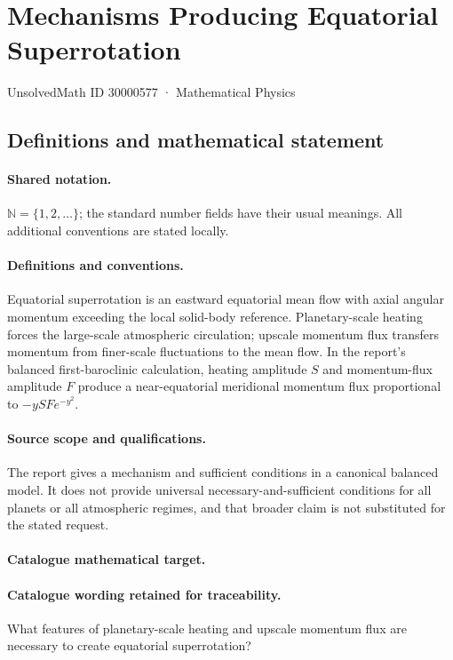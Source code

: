\documentclass[11pt]{article}
\begin{document}
\setcounter{section}{30000576}
\section{Mechanisms Producing Equatorial Superrotation}\label{30000577}
{\small UnsolvedMath ID 30000577 · Mathematical Physics}
\subsection{Definitions and mathematical statement}

\paragraph{Shared notation.}$\mathbb N=\{1,2,\ldots\}$; the standard number fields have their usual meanings. All additional conventions are stated locally.


\paragraph{Definitions and conventions.} Equatorial superrotation is an eastward equatorial mean flow with axial angular momentum exceeding the local solid-body reference. Planetary-scale heating forces the large-scale atmospheric circulation; upscale momentum flux transfers momentum from finer-scale fluctuations to the mean flow. In the report's balanced first-baroclinic calculation, heating amplitude $S$ and momentum-flux amplitude $F$ produce a near-equatorial meridional momentum flux proportional to $-ySF e^{-y^2}$.

\paragraph{Source scope and qualifications.} The report gives a mechanism and sufficient conditions in a canonical balanced model. It does not provide universal necessary-and-sufficient conditions for all planets or all atmospheric regimes, and that broader claim is not substituted for the stated request.

\paragraph{Catalogue mathematical target.}
\paragraph{Catalogue wording retained for traceability.}
What features of planetary-scale heating and upscale momentum flux are necessary to create equatorial superrotation?
\end{document}
